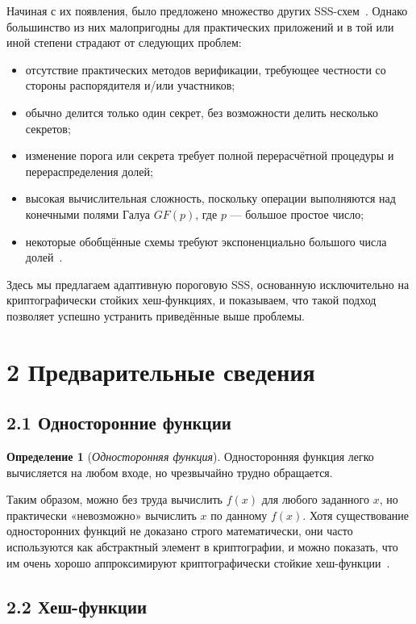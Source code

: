 Начиная с их появления, было предложено множество других SSS-схем~\cite{5}. Однако большинство из них малопригодны для практических приложений и в той или иной степени страдают от следующих проблем:

\begin{itemize}
\item отсутствие практических методов верификации, требующее честности со стороны распорядителя и/или участников;
\item обычно делится только один секрет, без возможности делить несколько секретов;
\item изменение порога или секрета требует полной перерасчётной процедуры и перераспределения долей;
\item высокая вычислительная сложность, поскольку операции выполняются над конечными полями Галуа \(GF(p)\), где \(p\) — большое простое число;
\item некоторые обобщённые схемы требуют экспоненциально большого числа долей~\cite{6}.
\end{itemize}

Здесь мы предлагаем адаптивную пороговую SSS, основанную исключительно на криптографически стойких хеш-функциях, и показываем, что такой подход позволяет успешно устранить приведённые выше проблемы.

\section*{2 \quad Предварительные сведения}

\subsection*{2.1 \quad Односторонние функции}

\textbf{Определение 1} (\textit{Односторонняя функция}). Односторонняя функция легко вычисляется на любом входе, но чрезвычайно трудно обращается.

Таким образом, можно без труда вычислить \(f(x)\) для любого заданного \(x\), но практически «невозможно» вычислить \(x\) по данному \(f(x)\). Хотя существование односторонних функций не доказано строго математически, они часто используются как абстрактный элемент в криптографии, и можно показать, что им очень хорошо аппроксимируют криптографически стойкие хеш-функции~\cite{2}.

\subsection*{2.2 \quad Хеш-функции}

